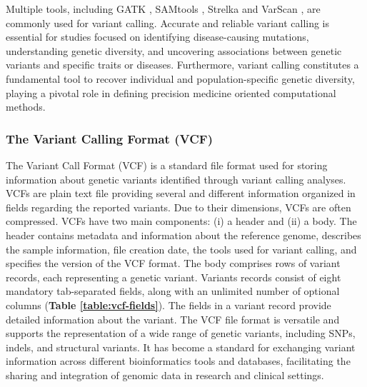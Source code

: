\documentclass[a4paper, titlepage, openright]{book}
\begin{document}
Multiple tools, including GATK \citep{mckenna2010genome}, SAMtools \citep{li2009sequence}, Strelka \citep{kim2018strelka2} and VarScan \citep{koboldt2012varscan}, are commonly used for variant calling. Accurate and reliable variant calling is essential for studies focused on identifying disease-causing mutations, understanding genetic diversity, and uncovering associations between genetic variants and specific traits or diseases. Furthermore, variant calling constitutes a fundamental tool to recover individual and population-specific genetic diversity, playing a pivotal role in defining precision medicine oriented computational methods.

\subsubsection{The Variant Calling Format (VCF)}
The Variant Call Format (VCF) is a standard file format used for storing information about genetic variants identified through variant calling analyses. VCFs are plain text file providing several and different information organized in fields regarding the reported variants. Due to their dimensions, VCFs are often compressed. VCFs have two main components: (i) a header and (ii) a body. The header contains metadata and information about the reference genome, describes the sample information, file creation date, the tools used for variant calling, and specifies the version of the VCF format. The body comprises rows of variant records, each representing a genetic variant.  Variants records consist of eight mandatory tab-separated fields, along with an unlimited number of optional columns (\textbf{Table \ref{table:vcf-fields}}). The fields in a variant record provide detailed information about the variant. The VCF file format is versatile and supports the representation of a wide range of genetic variants, including SNPs, indels, and structural variants. It has become a standard for exchanging variant information across different bioinformatics tools and databases, facilitating the sharing and integration of genomic data in research and clinical settings.
 
\end{document}
